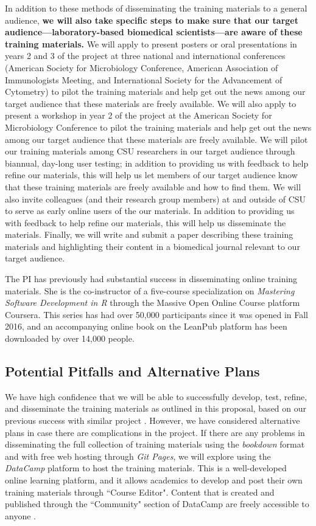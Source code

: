 \documentclass[pdftex,english,11pt,parskip=half]{scrartcl}
\begin{document}
In addition to these methods of disseminating the training materials to a general audience, \textbf{we will also take specific steps to make sure that our target audience---laboratory-based biomedical scientists---are aware of these training materials.} We will apply to present posters or oral presentations in years 2 and 3 of the project at three national and international conferences (American Society for Microbiology Conference, American Association of Immunologists Meeting, and International Society for the Advancement of Cytometry) to pilot the training materials and help get out the news among our target audience that these materials are freely available. We will also apply to present a workshop in year 2 of the project at the American Society for Microbiology Conference to pilot the training materials and help get out the news among our target audience that these materials are freely available. We will pilot our training materials among CSU researchers in our target audience through biannual, day-long user testing; in addition to providing us with feedback to help refine our materials, this will help us let members of our target audience know that these training materials are freely available and how to find them. We will also invite colleagues (and their research group members) at and outside of CSU to serve as early online users of the our materials. In addition to providing us with feedback to help refine our materials, this will help us disseminate the materials. Finally, we will write and submit a paper describing these training materials and highlighting their content in a biomedical journal relevant to our target audience.

The PI has previously had substantial success in disseminating online training materials. She is the co-instructor of a five-course specialization on \textit{Mastering Software Development in R} through the Massive Open Online Course platform Coursera. This series has had over 50,000 participants since it was opened in Fall 2016, and an accompanying online book on the LeanPub platform has been downloaded by over 14,000 people.

\subsection{Potential Pitfalls and Alternative Plans}

We have high confidence that we will be able to successfully develop, test, refine, and disseminate the training materials as outlined in this proposal, based on our previous success with similar project \cite{andersonmastering, andersoncoursebook}. However, we have considered alternative plans in case there are complications in the project. If there are any problems in disseminating the full collection of training materials using the \textit{bookdown} format and with free web hosting through \textit{Git Pages}, we will explore using the \textit{DataCamp} platform \cite{datacamp} to host the training materials. This is a well-developed online learning platform, and it allows academics to develop and post their own training materials through ``Course Editor". Content that is created and published through the ``Community" section of DataCamp are freely accessible to anyone \cite{authoringdatacamp}.  
\end{document}
